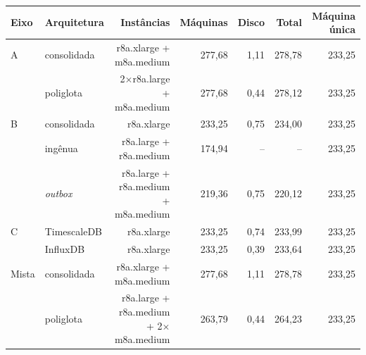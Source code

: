 \begin{tabular}{llrrrrr}
\hline
Eixo & Arquitetura & Instâncias & Máquinas & Disco & Total & Máquina única \\
\hline
A & consolidada & r8a.xlarge + m8a.medium & 277,68 & 1,11 & 278,78 & 233,25 \\
 & poliglota & 2$\times$r8a.large + m8a.medium & 277,68 & 0,44 & 278,12 & 233,25 \\
\hline
B & consolidada & r8a.xlarge & 233,25 & 0,75 & 234,00 & 233,25 \\
 & ingênua & r8a.large + r8a.medium & 174,94 & -- & -- & 233,25 \\
 & \emph{outbox} & r8a.large + r8a.medium + m8a.medium & 219,36 & 0,75 & 220,12 & 233,25 \\
\hline
C & TimescaleDB & r8a.xlarge & 233,25 & 0,74 & 233,99 & 233,25 \\
 & InfluxDB & r8a.xlarge & 233,25 & 0,39 & 233,64 & 233,25 \\
\hline
Mista & consolidada & r8a.xlarge + m8a.medium & 277,68 & 1,11 & 278,78 & 233,25 \\
 & poliglota & r8a.large + r8a.medium + 2$\times$m8a.medium & 263,79 & 0,44 & 264,23 & 233,25 \\
\hline
\end{tabular}
